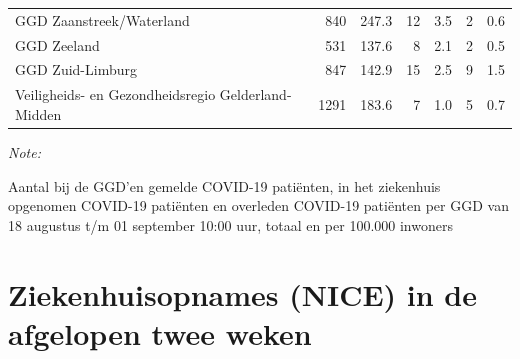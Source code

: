 \documentclass[
  english,
  man,floatsintext]{apa6}
\begin{document}
\begin{table}
\begin{threeparttable}
\begin{tabular}{lrrrrrr}
GGD Zaanstreek/Waterland & 840 & 247.3 & 12 & 3.5 & 2 & 0.6\\
GGD Zeeland & 531 & 137.6 & 8 & 2.1 & 2 & 0.5\\
GGD Zuid-Limburg & 847 & 142.9 & 15 & 2.5 & 9 & 1.5\\
Veiligheids- en Gezondheidsregio Gelderland-Midden & 1291 & 183.6 & 7 & 1.0 & 5 & 0.7\\
\bottomrule
\end{tabular}
\begin{tablenotes}
\item \textit{Note: } 
\item Aantal bij de GGD’en gemelde COVID-19 patiënten, in het ziekenhuis opgenomen COVID-19 patiënten en overleden COVID-19 patiënten per GGD van 18 augustus t/m 01 september 10:00 uur, totaal en per 100.000 inwoners
\end{tablenotes}
\end{threeparttable}
\endgroup{}
\end{table}

\newpage

\hypertarget{ziekenhuisopnames-nice-in-de-afgelopen-twee-weken}{%
\section{Ziekenhuisopnames (NICE) in de afgelopen twee weken}\label{ziekenhuisopnames-nice-in-de-afgelopen-twee-weken}}
\end{document}
